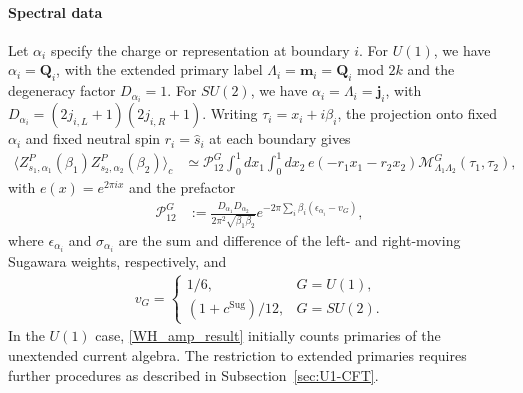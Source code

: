 \documentclass[11pt]{article}
\numberwithin{equation}{section}
\begin{document}
\paragraph{Spectral data}
  Let $\alpha_i$ specify the charge or representation at boundary $i$. For $U(1)$, we have $\alpha_i=\mathbf Q_i$, with the extended primary label $\Lambda_i=\mathbf m_i=\mathbf Q_i$ mod $2k$ and the degeneracy factor $D_{\alpha_i}=1$. For $SU(2)$, we have $\alpha_i=\Lambda_i=\mathbf j_i$, with $D_{\alpha_i}=(2j_{i,L}+1)(2j_{i,R}+1)$. Writing $\tau_i=x_i+i\beta_i$, the projection onto fixed $\alpha_i$ and fixed neutral spin $r_i=\hat{s}_i$ at each boundary gives
  \begin{equation}
\begin{aligned}
 \langle Z^P_{s_1,\alpha_1}(\beta_1)Z^P_{s_2,\alpha_2}(\beta_2)\rangle_c
 &\simeq \mathcal P^G_{12}
   \int_0^1 dx_1\int_0^1 dx_2\,
  e(-r_1x_1-r_2x_2)
   \mathcal M^G_{\Lambda_1\Lambda_2}(\tau_1,\tau_2),
\end{aligned}
\label{WH_amp_result}
\end{equation}
with $e(x)=e^{2\pi ix}$ and the prefactor
\begin{align}
    \mathcal P^G_{12}
 &:=\frac{D_{\alpha_1}D_{\alpha_2}}{2\pi^2\sqrt{\beta_1\beta_2}}
     e^{-2\pi\sum_i\beta_i(\epsilon_{\alpha_i}-v_G)},
\end{align}
where $\epsilon_{\alpha_i}$ and $\sigma_{\alpha_i}$ are the sum and difference of the left- and right-moving Sugawara weights, respectively, and
\begin{align}
    v_G=\begin{cases}
  1/6,&G=U(1),\\
  (1+c^{\mathrm{Sug}})/12,&G=SU(2).
 \end{cases}
\label{eq:continuous-neutral-frequencies}
\end{align}
 In the $U(1)$ case, \eqref{WH_amp_result} initially counts primaries of the unextended current algebra. The restriction to extended primaries requires further procedures as described in Subsection~\ref{sec:U1-CFT}.
\end{document}
